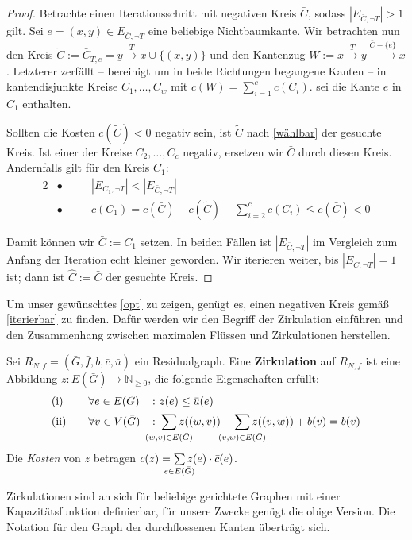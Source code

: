 \begin{proof}
Betrachte einen Iterationsschritt mit negativen Kreis $\bar{C}$, sodass $|E_{\bar{C},\neg T}|>1$ gilt. Sei $e=(x,y)\in E_{\bar{C},\neg T}$ eine beliebige Nichtbaumkante. Wir betrachten nun den Kreis $\tilde{C}:=\bar{C}_{T,e}=y\xrightarrow{T}x\cup\{(x,y)\}$ und den Kantenzug $W:=x\xrightarrow{T}y\xrightarrow{\bar{C}-\{e\}}x$. Letzterer zerfällt -- bereinigt um in beide Richtungen begangene Kanten -- in kantendisjunkte Kreise $C_1,\ldots,C_w$ mit $c(W)=\sum_{i=1}^{c} c(C_i)$. \Obda sei die Kante $e$ in $C_1$ enthalten.

Sollten die Kosten $c(\tilde{C})<0$ negativ sein, ist $\tilde{C}$ nach \cref{wählbar} der gesuchte Kreis. Ist einer der Kreise $C_2,\ldots,C_c$ negativ, ersetzen wir $\bar{C}$ durch diesen Kreis. Andernfalls gilt für den Kreis $C_1$:
\begin{alignat*}{2}
&\bullet\quad&&|E_{C_1,\neg T}|<|E_{\bar{C},\neg T}|\\
&\bullet\quad&&c(C_1)=c(\bar{C})-c(\tilde{C})-\sum_{i=2}^{c}c(C_i)\leq c(\bar{C})<0
\end{alignat*}

Damit können wir $\bar{C}:=C_1$ setzen. In beiden Fällen ist $|E_{\bar{C},\neg T}|$ im Vergleich zum Anfang der Iteration echt kleiner geworden. Wir iterieren weiter, bis $|E_{\bar{C},\neg T}|=1$ ist; dann ist $\hat{C}:=\bar{C}$ der gesuchte Kreis.\end{proof}

Um unser gewünschtes \cref{opt} zu zeigen, genügt es, einen negativen Kreis gemäß \cref{iterierbar} zu finden. Dafür werden wir den Begriff der Zirkulation einführen und den Zusammenhang zwischen maximalen Flüssen und Zirkulationen herstellen.

\begin{defn}\label{zirk}Sei $R_{N,f}= (\bar{G},\bar{f},b,\bar{c},\bar{u})$ ein Residualgraph. Eine \textbf{Zirkulation} auf $R_{N,f}$ ist eine Abbildung $z \colon E(\bar{G})\rightarrow\mathbb{N}_{\geq0}$, die folgende Eigenschaften erfüllt:
\begin{alignat}{3}
&\text{(i)}\quad&&\forall e\in E(\bar{G}) &&\colon z(e)\leq \bar{u}(e)\label{zirkI}\\
&\text{(ii)}\quad&&\forall v\in V(\bar{G}) &&\colon \sum_{\mathclap{(w,v)\in E(\bar{G})}} z((w,v)) - \sum_{\mathclap{(v,w)\in E(\bar{G})}} z((v,w)) + b(v) = b(v)\label{zirkII}
\end{alignat}
Die \emph{Kosten} von $z$ betragen $c(z) = \sum\limits_{\mathclap{e\in E(\bar{G})}} z(e)\cdot \bar{c}(e)$.
\end{defn}
\begin{anm}Zirkulationen sind an sich für beliebige gerichtete Graphen mit einer Kapazitätsfunktion definierbar, für unsere Zwecke genügt die obige Version. Die Notation für den Graph der durchflossenen Kanten überträgt sich.\end{anm}

